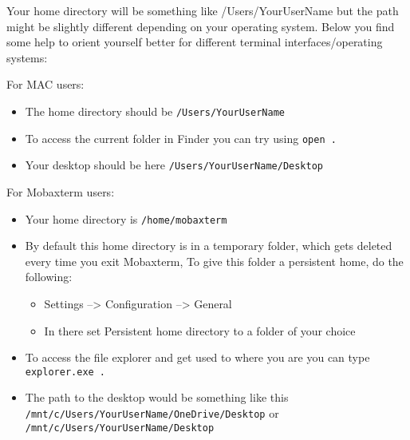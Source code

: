 \documentclass[
  letterpaper,
  DIV=11,
  numbers=noendperiod]{scrreprt}
\providecommand{\tightlist}{%
  \setlength{\itemsep}{0pt}\setlength{\parskip}{0pt}}\usepackage{longtable,booktabs,array}
\begin{document}
\begin{tcolorbox}[enhanced jigsaw, bottomtitle=1mm, colframe=quarto-callout-tip-color-frame, left=2mm, leftrule=.75mm, coltitle=black, colbacktitle=quarto-callout-tip-color!10!white, toprule=.15mm, rightrule=.15mm, opacityback=0, titlerule=0mm, colback=white, breakable, bottomrule=.15mm, title=\textcolor{quarto-callout-tip-color}{\faLightbulb}\hspace{0.5em}{Tip: finding the desktop on different user systems}, arc=.35mm, toptitle=1mm, opacitybacktitle=0.6]

Your home directory will be something like /Users/YourUserName but the
path might be slightly different depending on your operating system.
Below you find some help to orient yourself better for different
terminal interfaces/operating systems:

For MAC users:

\begin{itemize}
\tightlist
\item
  The home directory should be \texttt{/Users/YourUserName}
\item
  To access the current folder in Finder you can try using
  \texttt{open\ .}
\item
  Your desktop should be here \texttt{/Users/YourUserName/Desktop}
\end{itemize}

For Mobaxterm users:

\begin{itemize}
\tightlist
\item
  Your home directory is \texttt{/home/mobaxterm}
\item
  By default this home directory is in a temporary folder, which gets
  deleted every time you exit Mobaxterm, To give this folder a
  persistent home, do the following:

  \begin{itemize}
  \tightlist
  \item
    Settings --\textgreater{} Configuration --\textgreater{} General
  \item
    In there set Persistent home directory to a folder of your choice
  \end{itemize}
\item
  To access the file explorer and get used to where you are you can type
  \texttt{explorer.exe\ .}
\item
  The path to the desktop would be something like this
  \texttt{/mnt/c/Users/YourUserName/OneDrive/Desktop} or
  \texttt{/mnt/c/Users/YourUserName/Desktop}
\end{itemize}


\end{tcolorbox}
\end{document}
